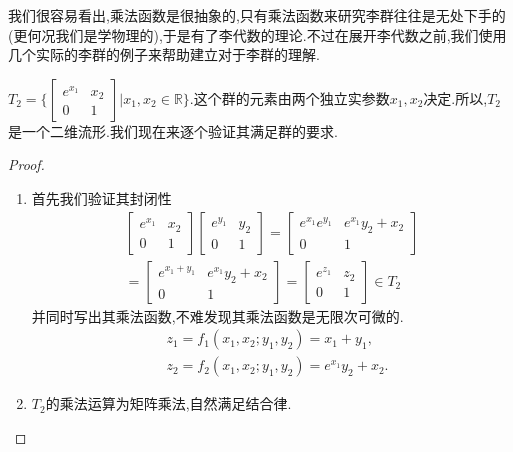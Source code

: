 我们很容易看出,乘法函数是很抽象的,只有乘法函数来研究李群往往是无处下手的(更何况我们是学物理的),于是有了李代数的理论.不过在展开李代数之前,我们使用几个实际的李群的例子来帮助建立对于李群的理解.
\begin{example}
    $T_2=\Big\{\begin{bmatrix}e^{x_1}&x_2\\0&1\end{bmatrix}\Big|x_1,x_2\in\mathbb{R}\Big\}$.这个群的元素由两个独立实参数$x_1,x_2$决定.所以,$T_2$是一个二维流形.我们现在来逐个验证其满足群的要求.
\end{example}
\begin{proof}
    \begin{enumerate}
        \item 首先我们验证其封闭性
        \begin{equation}
            \begin{gathered}\begin{bmatrix}e^{x_1}&x_2\\0&1\end{bmatrix}\begin{bmatrix}e^{y_1}&y_2\\0&1\end{bmatrix}=\begin{bmatrix}e^{x_1}e^{y_1}&e^{x_1}y_2+x_2\\0&1\end{bmatrix}\\=\begin{bmatrix}e^{x_1+y_1}&e^{x_1}y_2+x_2\\0&1\end{bmatrix}=\begin{bmatrix}e^{z_1}&z_2\\0&1\end{bmatrix}\in T_2\end{gathered}
        \end{equation}
        并同时写出其乘法函数,不难发现其乘法函数是无限次可微的.
        \begin{equation}
            \begin{aligned}&z_{1}=f_{1}(x_{1},x_{2};y_{1},y_{2})=x_{1}+y_{1},\\&z_{2}=f_{2}(x_{1},x_{2};y_{1},y_{2})=e^{x_{1}}y_{2}+x_{2}.\end{aligned}
        \end{equation}
        \item $T_2$的乘法运算为矩阵乘法,自然满足结合律.

\end{enumerate}
\end{proof}
